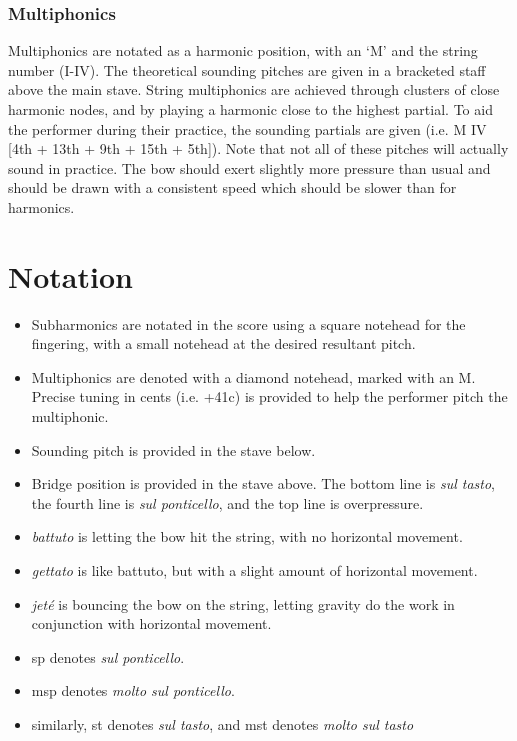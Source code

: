 \subsubsection*{Multiphonics}
Multiphonics are notated as a harmonic position, with an `M' and the string number (I-IV). 
The theoretical sounding pitches are given in a bracketed staff above the main stave.
String multiphonics are achieved through clusters of close harmonic nodes, and by playing a harmonic close to the highest partial.
To aid the performer during their practice, the sounding partials are given (i.e. M IV [4th + 13th + 9th + 15th + 5th]).
Note that not all of these pitches will actually sound in practice.
The bow should exert slightly more pressure than usual and should be drawn with a consistent speed which should be slower than for harmonics.

\section*{Notation}
\begin{itemize}

    \item Subharmonics are notated in the score using a square notehead for the fingering, with a small notehead at the desired resultant pitch.
    \item Multiphonics are denoted with a diamond notehead, marked with an M. Precise tuning in cents (i.e. +41c) is provided to help the performer pitch the multiphonic.
    \item Sounding pitch is provided in the stave below.
    \item Bridge position is provided in the stave above. The bottom line is \emph{sul tasto}, the fourth line is \emph{sul ponticello}, and the top line is overpressure.
    \item \emph{battuto} is letting the bow hit the string, with no horizontal movement.
    \item \emph{gettato} is like battuto, but with a slight amount of horizontal movement.
    \item \emph{jeté} is bouncing the bow on the string, letting gravity do the work in conjunction with horizontal movement.
    \item sp denotes \emph{sul ponticello}.
    \item msp denotes \emph{molto sul ponticello}.
    \item similarly, st denotes \emph{sul tasto}, and mst denotes \emph{molto sul tasto}
\end{itemize}

\newpage

% 
\label{app:The Veldt Score}
